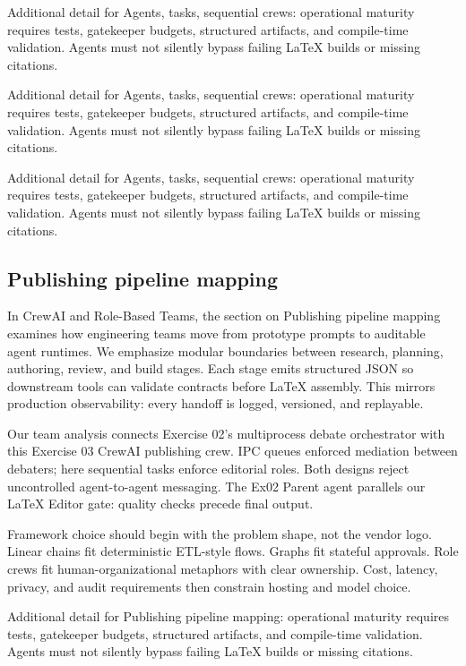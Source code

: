Additional detail for Agents, tasks, sequential crews: operational maturity requires tests, gatekeeper budgets, structured artifacts, and compile-time validation. Agents must not silently bypass failing LaTeX builds or missing citations. \cite{crewai2024} \cite{langgraph2024}

Additional detail for Agents, tasks, sequential crews: operational maturity requires tests, gatekeeper budgets, structured artifacts, and compile-time validation. Agents must not silently bypass failing LaTeX builds or missing citations. \cite{crewai2024} \cite{langgraph2024}

Additional detail for Agents, tasks, sequential crews: operational maturity requires tests, gatekeeper budgets, structured artifacts, and compile-time validation. Agents must not silently bypass failing LaTeX builds or missing citations. \cite{crewai2024} \cite{langgraph2024}

\subsection{Publishing pipeline mapping}
In CrewAI and Role-Based Teams, the section on Publishing pipeline mapping examines how engineering teams move from prototype prompts to auditable agent runtimes. We emphasize modular boundaries between research, planning, authoring, review, and build stages. Each stage emits structured JSON so downstream tools can validate contracts before LaTeX assembly. This mirrors production observability: every handoff is logged, versioned, and replayable. \cite{crewai2024} \cite{langgraph2024}

Our team analysis connects Exercise 02's multiprocess debate orchestrator with this Exercise 03 CrewAI publishing crew. IPC queues enforced mediation between debaters; here sequential tasks enforce editorial roles. Both designs reject uncontrolled agent-to-agent messaging. The Ex02 Parent agent parallels our LaTeX Editor gate: quality checks precede final output. \cite{crewai2024} \cite{langgraph2024}

Framework choice should begin with the problem shape, not the vendor logo. Linear chains fit deterministic ETL-style flows. Graphs fit stateful approvals. Role crews fit human-organizational metaphors with clear ownership. Cost, latency, privacy, and audit requirements then constrain hosting and model choice. \cite{crewai2024} \cite{langgraph2024}

Additional detail for Publishing pipeline mapping: operational maturity requires tests, gatekeeper budgets, structured artifacts, and compile-time validation. Agents must not silently bypass failing LaTeX builds or missing citations. \cite{crewai2024} \cite{langgraph2024}

